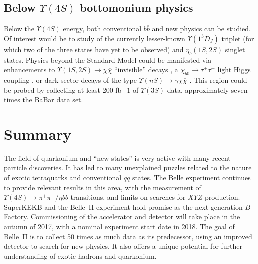 \documentclass[12pt]{article}
\begin{document}
\subsection{Below $\Upsilon(4S)$ bottomonium physics}
Below the $\Upsilon(4S)$ energy, both conventional $b\overline{b}$ and new physics can be studied. Of interest would be to study of the currently lesser-known $\Upsilon(1^{3}D_{J})$ triplet (for which two of the three states have yet to be observed) and $\eta_{b}(1S,2S)$ singlet states. Physics beyond the Standard Model could be manifested via enhancements to $\Upsilon(1S,2S)\to\chi\overline{\chi}$ ``invisible'' decays \cite{th_inv}, a $\chi_{b0}\to\tau^{+}\tau^{-}$ light Higgs coupling \cite{th_carl}, or dark sector decays of the type $\Upsilon(nS)\to\gamma\chi\overline{\chi}$ \cite{th_ds}. This region could be probed by collecting at least 200 fb${-1}$ of $\Upsilon(3S)$ data, approximately seven times the BaBar data set.

\section{Summary}
The field of quarkonium and ``new states'' is very active with many recent particle discoveries. It has led to many unexplained puzzles related to the nature of exotic tetraquarks and conventional $q\overline{q}$ states. The Belle experiment continues to provide relevant results in this area, with the measurement of $\Upsilon(4S)\to\pi^{+}\pi^{-}/\eta b\overline{b}$ transitions, and limits on searches for $XYZ$ production. SuperKEKB and the Belle~II experiment hold promise as the next generation $B$-Factory. Commissioning of the accelerator and detector will take place in the autumn of 2017, with a nominal experiment start date in 2018. The goal of Belle~II is to collect 50 times as much data as its predecessor, using an improved detector to search for new physics. It also offers a unique potential for further understanding of exotic hadrons and quarkonium.
\end{document}
